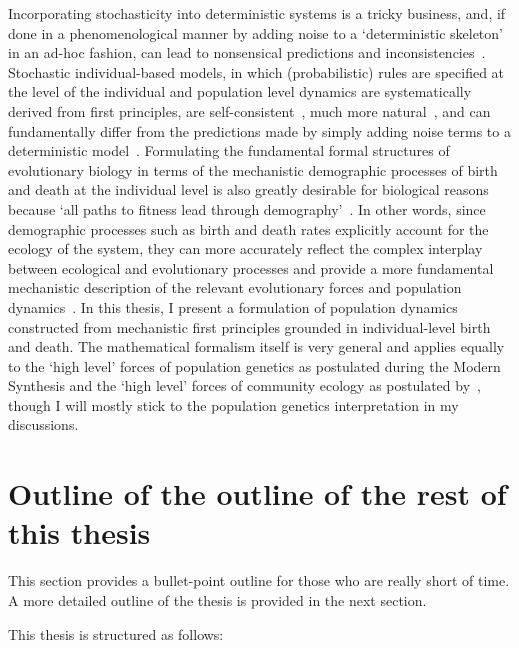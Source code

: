 Incorporating stochasticity into deterministic systems is a tricky business, and, if done in a phenomenological manner by adding noise to a `deterministic skeleton'~\citep{coulson_skeletons_2004} in an ad-hoc fashion, can lead to nonsensical predictions and inconsistencies~\citep{strang_how_2019}. Stochastic individual-based models, in which (probabilistic) rules are specified at the level of the individual and population level dynamics are systematically derived from first principles, are self-consistent~\citep{strang_how_2019}, much more natural~\citep{black_stochastic_2012}, and can fundamentally differ from the predictions made by simply adding noise terms to a deterministic model~\citep{strang_how_2019}. Formulating the fundamental formal structures of evolutionary biology in terms of the mechanistic demographic processes of birth and death at the individual level is also greatly desirable for biological reasons~\citep{metcalf_why_2007,geritz_mathematical_2012} because `all paths to fitness lead through demography'~\citep{metcalf_all_2007}. In other words, since demographic processes such as birth and death rates explicitly account for the ecology of the system, they can more accurately reflect the complex interplay between ecological and evolutionary processes and provide a more fundamental mechanistic description of the relevant evolutionary forces and population dynamics~\citep{doebeli_towards_2017}. In this thesis, I present a formulation of population dynamics constructed from mechanistic first principles grounded in individual-level birth and death. The mathematical formalism itself is very general and applies equally to the `high level' forces of population genetics as postulated during the Modern Synthesis and the `high level' forces of community ecology as postulated by~\cite{vellend_theory_2016}, though I will mostly stick to the population genetics interpretation in my discussions.

\section{Outline of the outline of the rest of this thesis}
This section provides a bullet-point outline for those who are really short of time. A more detailed outline of the thesis is provided in the next section.

This thesis is structured as follows:

